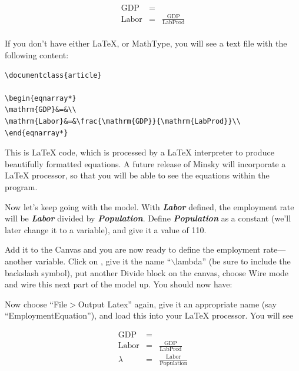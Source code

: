 \begin{eqnarray*}
\mathrm{GDP}&=&\\
\mathrm{Labor}&=&\frac{\mathrm{GDP}}{\mathrm{LabProd}}\\
\end{eqnarray*}

If you don't have either \LaTeX, or MathType, you will see a text file with the following content:
\begin{verbatim}
\documentclass{article}

\begin{eqnarray*}
\mathrm{GDP}&=&\\
\mathrm{Labor}&=&\frac{\mathrm{GDP}}{\mathrm{LabProd}}\\
\end{eqnarray*}

\end{verbatim}

This is \LaTeX{} code, which is processed by a \LaTeX{} interpreter to
produce beautifully formatted equations. A future release of Minsky
will incorporate a \LaTeX{} processor, so that you will be able to see
the equations within the program. 


Now let's keep going with the model. With {\bf\em Labor} defined, the
employment rate will be {\bf\em  Labor} divided by {\bf\em
Population}. Define {\bf\em Population} as a constant (we'll later
change it to a variable), and give it a value of 110. 

\begin{center}
\end{center}



Add it to the Canvas and you are now ready to define the employment
rate---another variable. Click on , give it
the name ``$\backslash$lambda'' (be sure to include the backslash symbol), put
another Divide block on the canvas, choose Wire mode and wire this
next part of the model up. You should now have:



Now choose ``File$>$Output Latex'' again, give it an appropriate name (say ``EmploymentEquation''), and load this into your LaTeX processor. You will see

\begin{eqnarray*}
\mathrm{GDP}&=&\\
\mathrm{Labor}&=&\frac{\mathrm{GDP}}{\mathrm{LabProd}}\\
\lambda&=&\frac{\mathrm{Labor}}{\mathrm{Population}}\\
\end{eqnarray*}

